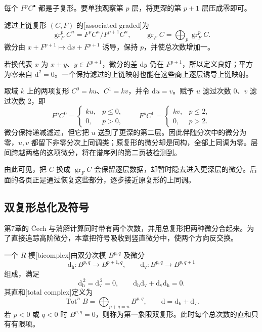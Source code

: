 每个 \(F^pC^\bullet\) 都是子复形。要单独观察第 \(p\) 层，将更深的第 \(p+1\) 层压成零即可。

\begin{definition}[伴随分次复形]\label{g2:def:associated-graded-complex}
	滤过上链复形 \((C,F)\) 的[associated graded]为
	\[
		\operatorname{gr}_F^pC^n=F^pC^n/F^{p+1}C^n,\qquad
		\operatorname{gr}_F C=\bigoplus_p\operatorname{gr}_F^pC.
	\]
	微分由 \(x+F^{p+1}\mapsto\mathrm dx+F^{p+1}\) 诱导，保持 \(p\)，并使总次数增加一。
\end{definition}

若换代表 \(x\) 为 \(x+y\)、\(y\in F^{p+1}\)，微分的差 \(\mathrm dy\) 仍在 \(F^{p+1}\)，所以定义良好；平方为零来自 \(\mathrm d^2=0\)。一个保持滤过的上链映射也能在这些商上逐层诱导上链映射。

\begin{example}\label{g2:exm:graded-zero-nonzero-differential}
	取域 \(k\) 上的两项复形 \(C^0=ku\)、\(C^1=kv\)，并令 \(\mathrm du=v\)。赋予 \(u\) 滤过次数 \(0\)、\(v\) 滤过次数 \(2\)，即
	\[
		F^pC^0=\begin{cases}ku,&p\le0,\\0,&p>0,\end{cases}
		\qquad
		F^pC^1=\begin{cases}kv,&p\le2,\\0,&p>2.\end{cases}
	\]
	微分保持递减滤过，但它把 \(u\) 送到了更深的第二层。因此伴随分次中的微分为零，\(u,v\) 都留下非零分次上同调类；原复形的微分却是同构，全部上同调为零。层间跨越两格的这项微分，将在谱序列的第二页被检测到。
\end{example}

由此可见，把 \(C\) 换成 \(\operatorname{gr}_F C\) 会保留逐层数据，却暂时隐去进入更深层的微分。后面的各页正是通过恢复这些部分，逐步接近原复形的上同调。

\subsection{双复形总化及符号}
\label{g2:subsec:1001:04}

第7章的 Čech 与消解计算同时带有两个次数，并用总复形把两种微分合起来。为了直接追踪高阶微分，本章把符号吸收到竖直微分中，使两个方向反交换。

\begin{definition}[双复形与总复形]\label{g2:def:anticommuting-bicomplex}
	一个 \(R\) 模[bicomplex]由双分次模 \(B^{p,q}\) 及微分
	\[
		\mathrm d_{\mathrm h}:B^{p,q}\longrightarrow B^{p+1,q},\qquad
		\mathrm d_{\mathrm v}:B^{p,q}\longrightarrow B^{p,q+1}
	\]
	组成，满足
	\[
		\mathrm d_{\mathrm h}^{\,2}=\mathrm d_{\mathrm v}^{\,2}=0,\qquad
		\mathrm d_{\mathrm h}\mathrm d_{\mathrm v}+\mathrm d_{\mathrm v}\mathrm d_{\mathrm h}=0.
	\]
	其直和[total complex]定义为
	\[
		\operatorname{Tot}^nB=\bigoplus_{p+q=n}B^{p,q},\qquad
		\mathrm d=\mathrm d_{\mathrm h}+\mathrm d_{\mathrm v}.
	\]
	若 \(p<0\) 或 \(q<0\) 时 \(B^{p,q}=0\)，则称为第一象限双复形。此时每个总次数的直和只有有限项。
\end{definition}

